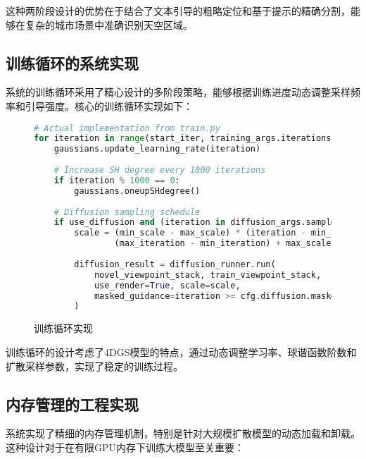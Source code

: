 这种两阶段设计的优势在于结合了文本引导的粗略定位和基于提示的精确分割，能够在复杂的城市场景中准确识别天空区域。

\subsection{训练循环的系统实现}

系统的训练循环采用了精心设计的多阶段策略，能够根据训练进度动态调整采样频率和引导强度。核心的训练循环实现如下：

\begin{figure}[!b]
  \begin{tmpbox}
    \begin{lstlisting}[language=Python]
# Actual implementation from train.py
for iteration in range(start_iter, training_args.iterations + 1):
    gaussians.update_learning_rate(iteration)
    
    # Increase SH degree every 1000 iterations
    if iteration % 1000 == 0:
        gaussians.oneupSHdegree()
    
    # Diffusion sampling schedule
    if use_diffusion and (iteration in diffusion_args.sample_iterations):
        scale = (min_scale - max_scale) * (iteration - min_iteration) / \
                (max_iteration - min_iteration) + max_scale
        
        diffusion_result = diffusion_runner.run(
            novel_viewpoint_stack, train_viewpoint_stack, 
            use_render=True, scale=scale,
            masked_guidance=iteration >= cfg.diffusion.masked_guidance_iter
        )
\end{lstlisting}
  \end{tmpbox}
  \caption{训练循环实现}
  \label{fig:train-loop-code}
\end{figure}

训练循环的设计考虑了4DGS模型的特点，通过动态调整学习率、球谐函数阶数和扩散采样参数，实现了稳定的训练过程。

\subsection{内存管理的工程实现}

系统实现了精细的内存管理机制，特别是针对大规模扩散模型的动态加载和卸载。这种设计对于在有限GPU内存下训练大模型至关重要：


